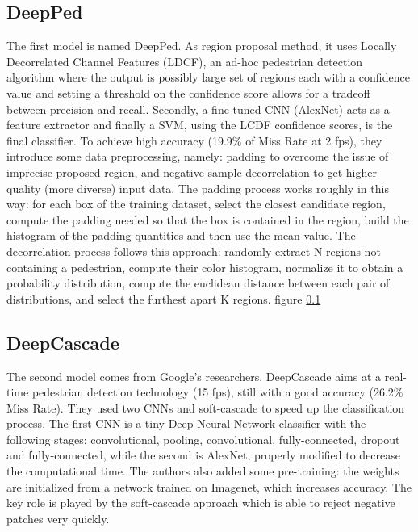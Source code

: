 \documentclass[10pt,journal,compsoc]{IEEEtran}
\begin{document}
\subsection{DeepPed}
\label{sub:DeepPed}

The first model is named DeepPed. As region proposal method, it uses Locally
Decorrelated Channel Features (LDCF), an ad-hoc pedestrian detection algorithm
where the output is possibly large set of regions each with a confidence value
and setting a threshold on the confidence score allows for a tradeoff between
precision and recall. Secondly, a fine-tuned CNN (AlexNet) acts as a feature
extractor and finally a SVM, using the LCDF confidence scores, is the final
classifier. To achieve high accuracy (19.9\% of Miss Rate at 2 fps), they introduce
some data preprocessing, namely: padding to overcome the issue of imprecise proposed
region, and negative sample decorrelation to get higher quality (more diverse) input data.
The padding process works roughly in this way: for each box of the training dataset,
 select the closest candidate region, compute the padding needed so that the box
 is contained in the region, build the histogram of the padding quantities and then
 use the mean value. The decorrelation process follows this approach: randomly
 extract N regions not containing a pedestrian, compute their color histogram,
 normalize it to obtain a probability distribution, compute the euclidean
 distance between each pair of distributions, and select the furthest apart K regions.
 figure \ref{sub:DeepPed}
\subsection{DeepCascade}
 \label{sub:DeepCascade}

 The second model comes from Google’s researchers. DeepCascade aims at a real-time
 pedestrian detection technology (15 fps), still with a good accuracy (26.2\% Miss Rate).
  They used two CNNs and soft-cascade to speed up the classification process.
  The first CNN is a tiny Deep Neural Network classifier with the following stages:
  convolutional, pooling, convolutional, fully-connected, dropout and fully-connected,
  while the second is AlexNet, properly modified to decrease the computational time.
  The authors also added some pre-training: the weights are initialized from a
  network trained on Imagenet, which increases accuracy. The key role is played
  by the soft-cascade approach which is able to reject negative patches very quickly.
\end{document}
